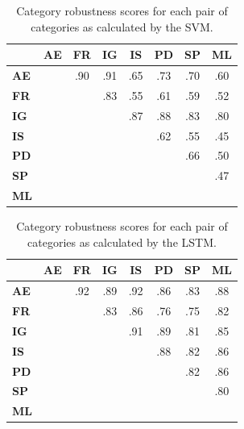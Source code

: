 \documentclass[letterpaper, 12 pt, conference]{ieeeconf}
\begin{document}
\begin{table}[tbp]
    \centering
    \begin{tabular}{lccccccc}
        \toprule
            &
            \multicolumn{1}{c}{\textbf{AE}} & \multicolumn{1}{c}{\textbf{FR}} & \multicolumn{1}{c}{\textbf{IG}} & \multicolumn{1}{c}{\textbf{IS}} & \multicolumn{1}{c}{\textbf{PD}} & \multicolumn{1}{c}{\textbf{SP}} & \multicolumn{1}{c}{\textbf{ML}} \\
        \midrule
            \textbf{AE} & & .90 & .91 & .65 & .73 & .70 & .60 \\
            \textbf{FR} & &     & .83 & .55 & .61 & .59 & .52 \\
            \textbf{IG} & &     &     & .87 & .88 & .83 & .80 \\
            \textbf{IS} & &     &     &     & .62 & .55 & .45 \\ 
            \textbf{PD} & &     &     &     &     & .66 & .50 \\ 
            \textbf{SP} & &     &     &     &     &     & .47 \\ 
            \textbf{ML} & &     &     &     &     &     &     \\ 
        \bottomrule
    \end{tabular}
    \caption{Category robustness scores for each pair of categories as calculated by the SVM.}
    \label{table:svm}
\end{table}
\begin{table}[t!]
    \centering
    \begin{tabular}{lccccccc}
        \toprule
            &
            \multicolumn{1}{c}{\textbf{AE}} & \multicolumn{1}{c}{\textbf{FR}} & \multicolumn{1}{c}{\textbf{IG}} & \multicolumn{1}{c}{\textbf{IS}} & \multicolumn{1}{c}{\textbf{PD}} & \multicolumn{1}{c}{\textbf{SP}} & \multicolumn{1}{c}{\textbf{ML}} \\
        \midrule
            \textbf{AE} & & .92 & .89 & .92 & .86 & .83 & .88 \\
            \textbf{FR} & &     & .83 & .86 & .76 & .75 & .82 \\
            \textbf{IG} & &     &     & .91 & .89 & .81 & .85 \\
            \textbf{IS} & &     &     &     & .88 & .82 & .86 \\ 
            \textbf{PD} & &     &     &     &     & .82 & .86 \\ 
            \textbf{SP} & &     &     &     &     &     & .80 \\ 
            \textbf{ML} & &     &     &     &     &     &     \\ 
        \bottomrule
    \end{tabular}
    \caption{Category robustness scores for each pair of categories as calculated by the LSTM.}
    \label{table:lstm}
\end{table}
\end{document}
